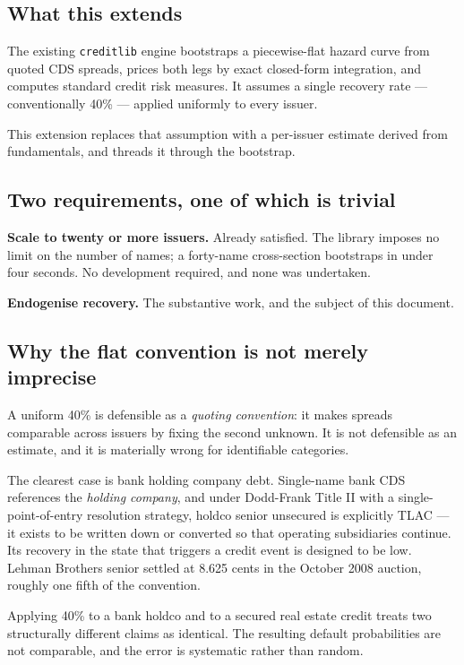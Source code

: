 \documentclass[11pt,a4paper]{article}
\newcommand{\keypoint}[1]{\par\vspace{0.4em}\noindent
  \colorbox{codebg}{\parbox{\dimexpr\linewidth-2\fboxsep}{\small #1}}\par\vspace{0.5em}}
\begin{document}
\subsection{What this extends}

The existing \texttt{creditlib} engine bootstraps a piecewise-flat hazard curve from
quoted CDS spreads, prices both legs by exact closed-form integration, and computes
standard credit risk measures. It assumes a single recovery rate --- conventionally
40\% --- applied uniformly to every issuer.

This extension replaces that assumption with a per-issuer estimate derived from
fundamentals, and threads it through the bootstrap.

\subsection{Two requirements, one of which is trivial}

\textbf{Scale to twenty or more issuers.} Already satisfied. The library imposes no
limit on the number of names; a forty-name cross-section bootstraps in under four
seconds. No development required, and none was undertaken.

\textbf{Endogenise recovery.} The substantive work, and the subject of this document.

\subsection{Why the flat convention is not merely imprecise}

A uniform 40\% is defensible as a \emph{quoting convention}: it makes spreads
comparable across issuers by fixing the second unknown. It is not defensible as an
estimate, and it is materially wrong for identifiable categories.

The clearest case is bank holding company debt. Single-name bank CDS references the
\emph{holding company}, and under Dodd-Frank Title II with a single-point-of-entry
resolution strategy, holdco senior unsecured is explicitly TLAC --- it exists to be
written down or converted so that operating subsidiaries continue. Its recovery in
the state that triggers a credit event is designed to be low. Lehman Brothers senior
settled at 8.625 cents in the October 2008 auction, roughly one fifth of the convention.

\keypoint{Applying 40\% to a bank holdco and to a secured real estate credit treats
two structurally different claims as identical. The resulting default probabilities
are not comparable, and the error is systematic rather than random.}
\end{document}
